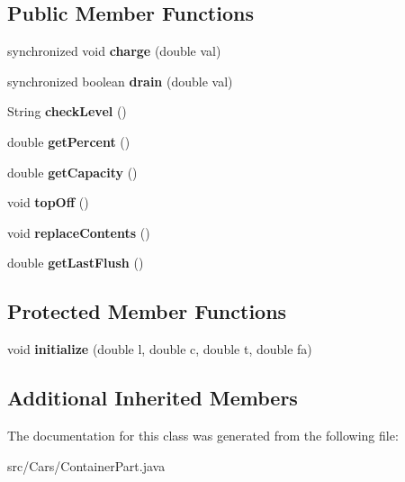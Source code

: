 \subsection*{Public Member Functions}
\begin{DoxyCompactItemize}
\item 
\hypertarget{classCars_1_1ContainerPart_aee6d47b18bd47d9d0ae3df15850d8ef0}{}synchronized void {\bfseries charge} (double val)\label{classCars_1_1ContainerPart_aee6d47b18bd47d9d0ae3df15850d8ef0}

\item 
\hypertarget{classCars_1_1ContainerPart_a336bd533d055d4b00a8b9d9c95efbc04}{}synchronized boolean {\bfseries drain} (double val)\label{classCars_1_1ContainerPart_a336bd533d055d4b00a8b9d9c95efbc04}

\item 
\hypertarget{classCars_1_1ContainerPart_ad1c5e9148925a436030bebe633e853f6}{}String {\bfseries check\+Level} ()\label{classCars_1_1ContainerPart_ad1c5e9148925a436030bebe633e853f6}

\item 
\hypertarget{classCars_1_1ContainerPart_a21a9469aedf362d4e77e2a4d4fa4333f}{}double {\bfseries get\+Percent} ()\label{classCars_1_1ContainerPart_a21a9469aedf362d4e77e2a4d4fa4333f}

\item 
\hypertarget{classCars_1_1ContainerPart_a16cfca5c5cc7e094fea194d66d15ce96}{}double {\bfseries get\+Capacity} ()\label{classCars_1_1ContainerPart_a16cfca5c5cc7e094fea194d66d15ce96}

\item 
\hypertarget{classCars_1_1ContainerPart_abb73374ab7b33c860c8a6da853f69cdd}{}void {\bfseries top\+Off} ()\label{classCars_1_1ContainerPart_abb73374ab7b33c860c8a6da853f69cdd}

\item 
\hypertarget{classCars_1_1ContainerPart_a6d9dc65ef1b5c949e520291701b6b632}{}void {\bfseries replace\+Contents} ()\label{classCars_1_1ContainerPart_a6d9dc65ef1b5c949e520291701b6b632}

\item 
\hypertarget{classCars_1_1ContainerPart_aa75f39e4ed5153272e1b878c3050e7a6}{}double {\bfseries get\+Last\+Flush} ()\label{classCars_1_1ContainerPart_aa75f39e4ed5153272e1b878c3050e7a6}

\end{DoxyCompactItemize}
\subsection*{Protected Member Functions}
\begin{DoxyCompactItemize}
\item 
\hypertarget{classCars_1_1ContainerPart_a8ddc2f1fb791c2ed0a55d0cd8e1f10fc}{}void {\bfseries initialize} (double l, double c, double t, double fa)\label{classCars_1_1ContainerPart_a8ddc2f1fb791c2ed0a55d0cd8e1f10fc}

\end{DoxyCompactItemize}
\subsection*{Additional Inherited Members}


The documentation for this class was generated from the following file\+:\begin{DoxyCompactItemize}
\item 
src/\+Cars/Container\+Part.\+java\end{DoxyCompactItemize}
